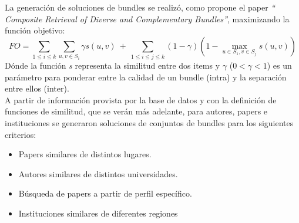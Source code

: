 La generación de soluciones de bundles se realizó, como propone el paper \textit{\textquotedblleft 
Composite Retrieval of Diverse and Complementary Bundles\textquotedblright}, maximizando la función 
objetivo: 
\begin{equation}\label{eq:fnObj}
\displaystyle FO = \sum_{1 \leq i \leq k} \displaystyle\sum_{u,v \in S_{i}} \gamma s(u,v)\ 
+\ \displaystyle\sum_{1 \leq i \leq j \leq k} (1-\gamma) (1 - \displaystyle\max_{u \in S_{1}, v 
\in S_{j}} s(u,v))
\end{equation} 
Dónde la función \textit{s} representa la similitud entre dos items y 
$\gamma$ ($0 < \gamma < 1$) es un parámetro para ponderar entre la calidad de un bundle (intra) y 
la separación entre ellos (inter).\\
A partir de información provista por la base de datos y con la definición de funciones de 
similitud, que se verán más adelante, para autores, papers e instituciones se generaron soluciones de 
conjuntos de bundles para los siguientes criterios:
\begin{itemize}
 \item Papers similares de distintos lugares.
 \item Autores similares de distintos universidades.
 \item Búsqueda de papers a partir de perfil específico.
 \item Instituciones similares de diferentes regiones
\end{itemize}
